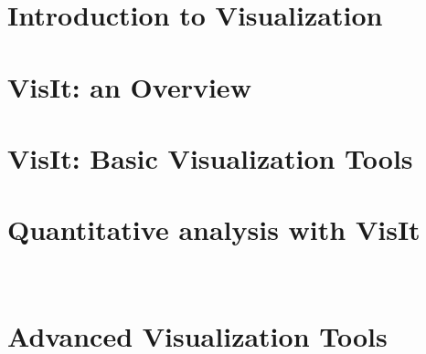 \documentclass[xcolor=svgnames]{beamer}
\providecommand{\sectionpage}{\Large\centering \bf\mediumblue\insertsection}
\begin{document}
\section{Introduction to Visualization}
\frame{\sectionpage}
\introEnv
  
\resetEnv

\section{VisIt: an Overview}
\frame{\sectionpage}
\basicEnv
 
\resetEnv

\section{VisIt: Basic Visualization Tools}
\frame{\sectionpage}
  \usestructuretemplate{\color{structure}}{} 
 
\resetEnv

\section{Quantitative analysis with VisIt}
\frame{\sectionpage}
  \usestructuretemplate{\color{structure}}{} 
\
 
\resetEnv

\section{Advanced Visualization Tools}
\frame{\sectionpage}
  \usestructuretemplate{\color{structure}}{} 
 
\resetEnv
\end{document}
